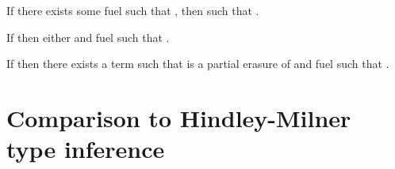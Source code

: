 \begin{lemma}
  If there exists some fuel \ltiFuel{} such that
    \ltitSstkjudgement{\ltimakeCombinedThreadedEnv{\ltiFuel{}}{\ltiEmptyClosureCache}}
                      {\ltiEnv{}}
                      {}
                      {\ltiT{}}
                      {\ltimakeCombinedThreadedEnv{\ltiFuelp{}}{\ltiClosureCache{}}}
                      {},
                      then
    \ltitSdjudgement{\ltielimClosEnvLHS{\ltiClosureCache{}}{\ltiEnv{}}}
                    {}
                    {\ltiS{}}
                    {\ltiEp{}}
                    such that
                      \ltiisubtype{\ltielimClosEnvLHS{\ltiClosureCache{}}{\ltiEnv{}}}{\ltiS{}}{\ltielimClosTLHS{\varnothing}{\ltiClosureCache{}}{\ltiT{}}}.
\end{lemma}

\begin{lemma}
  If \ltitSdjudgement{\ltiEnv{}}
                     {\ltiE{}}
                     {\ltiT{}}
                     {\ltiEp{}}
                     then
    either
    and fuel \ltiFuel{}
    such that
    \ltitSstkjudgement{\ltimakeCombinedThreadedEnv{\ltiFuel{}}{\ltiEmptyClosureCache}}
                      {\ltiEnv{}}
                      {\ltiF{}}
                      {\ltiT{}}
                      {\ltimakeCombinedThreadedEnv{\ltiFuelp{}}{\ltiClosureCache{}}}
                      {\ltiFp{}}.
\end{lemma}

\begin{lemma}
  If \ltitSdjudgement{\ltiEnv{}}
                     {\ltiE{}}
                     {\ltiT{}}
                     {\ltiEp{}}
                     then
    there exists a term \ltiF{} such that \ltiE{} is a partial erasure of \ltiF{}
    and fuel \ltiFuel{}
    such that
    \ltitSstkjudgement{\ltimakeCombinedThreadedEnv{\ltiFuel{}}{\ltiEmptyClosureCache}}
                      {\ltiEnv{}}
                      {\ltiF{}}
                      {\ltiT{}}
                      {\ltimakeCombinedThreadedEnv{\ltiFuelp{}}{\ltiClosureCache{}}}
                      {\ltiFp{}}.
\end{lemma}

\section{Comparison to Hindley-Milner type inference}


